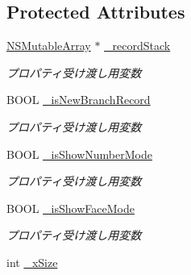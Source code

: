 \subsection*{Protected Attributes}
\begin{DoxyCompactItemize}
\item 
\hypertarget{interface_games_a7f97e43d2e57ea8b8d24bbebec583013}{
\hyperlink{class_n_s_mutable_array}{NSMutableArray} $\ast$ \hyperlink{interface_games_a7f97e43d2e57ea8b8d24bbebec583013}{\_\-recordStack}}
\label{interface_games_a7f97e43d2e57ea8b8d24bbebec583013}

\begin{DoxyCompactList}\small\item\em プロパティ受け渡し用変数 \end{DoxyCompactList}\item 
\hypertarget{interface_games_af1c274d54923dce41904ba78f1256ac5}{
BOOL \hyperlink{interface_games_af1c274d54923dce41904ba78f1256ac5}{\_\-isNewBranchRecord}}
\label{interface_games_af1c274d54923dce41904ba78f1256ac5}

\begin{DoxyCompactList}\small\item\em プロパティ受け渡し用変数 \end{DoxyCompactList}\item 
\hypertarget{interface_games_a8ee250541d4087020e432fbe7bb6d88f}{
BOOL \hyperlink{interface_games_a8ee250541d4087020e432fbe7bb6d88f}{\_\-isShowNumberMode}}
\label{interface_games_a8ee250541d4087020e432fbe7bb6d88f}

\begin{DoxyCompactList}\small\item\em プロパティ受け渡し用変数 \end{DoxyCompactList}\item 
\hypertarget{interface_games_ae6552ce4721f9e61174e044c9d23d86f}{
BOOL \hyperlink{interface_games_ae6552ce4721f9e61174e044c9d23d86f}{\_\-isShowFaceMode}}
\label{interface_games_ae6552ce4721f9e61174e044c9d23d86f}

\begin{DoxyCompactList}\small\item\em プロパティ受け渡し用変数 \end{DoxyCompactList}\item 
\hypertarget{interface_games_abb798d37b60e6016079ec2c01335624d}{
int \hyperlink{interface_games_abb798d37b60e6016079ec2c01335624d}{\_\-xSize}}
\label{interface_games_abb798d37b60e6016079ec2c01335624d}


\end{DoxyCompactItemize}
